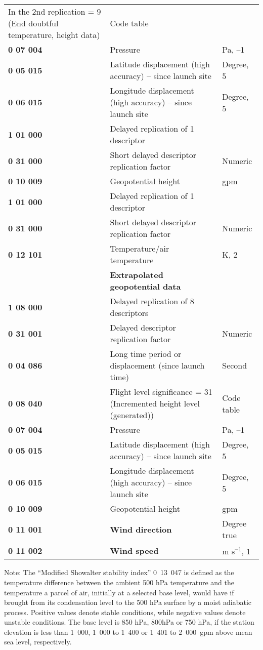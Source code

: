 \begin{longtable}[]{@{}lll@{}}
\begin{minipage}[t]{0.30\columnwidth}
In the 2nd replication = 9 (End doubtful temperature, height data)\strut
\end{minipage} & \begin{minipage}[t]{0.30\columnwidth}\raggedright
Code table\strut
\end{minipage}\tabularnewline
\textbf{0 07 004} & Pressure & Pa, --1\tabularnewline
\textbf{0 05 015} & Latitude displacement (high accuracy) -- since launch site & Degree, 5\tabularnewline
\textbf{0 06 015} & Longitude displacement (high accuracy) -- since launch site & Degree, 5\tabularnewline
\textbf{1 01 000} & Delayed replication of 1 descriptor &\tabularnewline
\textbf{0 31 000} & Short delayed descriptor replication factor & Numeric\tabularnewline
\textbf{0 10 009} & Geopotential height & gpm\tabularnewline
\textbf{1 01 000} & Delayed replication of 1 descriptor &\tabularnewline
\textbf{0 31 000} & Short delayed descriptor replication factor & Numeric\tabularnewline
\textbf{0 12 101} & Temperature/air temperature & K, 2\tabularnewline
& \textbf{Extrapolated geopotential data} &\tabularnewline
\textbf{1 08 000} & Delayed replication of 8 descriptors &\tabularnewline
\textbf{0 31 001} & Delayed descriptor replication factor & Numeric\tabularnewline
\textbf{0 04 086} & Long time period or displacement (since launch time) & Second\tabularnewline
\textbf{0 08 040} & Flight level significance = 31 (Incremented height level (generated)) & Code table\tabularnewline
\textbf{0 07 004} & Pressure & Pa, --1\tabularnewline
\textbf{0 05 015} & Latitude displacement (high accuracy) -- since launch site & Degree, 5\tabularnewline
\textbf{0 06 015} & Longitude displacement (high accuracy) -- since launch site & Degree, 5\tabularnewline
\textbf{0 10 009} & Geopotential height & gpm\tabularnewline
\textbf{0 11 001} & \textbf{Wind direction} & Degree true\tabularnewline
\textbf{0 11 002} & \textbf{Wind speed} & m s\textsuperscript{--1}, 1\tabularnewline
\bottomrule
\end{longtable}

Note: The ``Modified Showalter stability index'' 0~13~047 is defined as the temperature difference between the ambient 500 hPa temperature and the temperature a parcel of air, initially at a selected base level, would have if brought from its condensation level to the 500 hPa surface by a moist adiabatic process. Positive values denote stable conditions, while negative values denote unstable conditions. The base level is 850 hPa, 800hPa or 750 hPa, if the station elevation is less than 1~000, 1~000 to 1~400 or 1~401 to 2~000~gpm above mean sea level, respectively.

